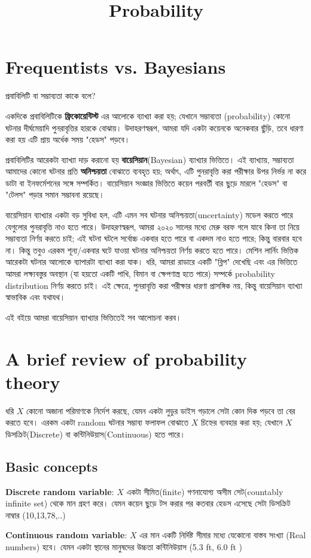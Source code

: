 \documentclass[graybox, envcountchap, twocolumn]{styles/svmult}
\begin{document}
\title{Probability}
{\bengalifont
\section{Frequentists vs. Bayesians}
প্রবাবিলিটি বা সম্ভাব্যতা কাকে বলে?

একদিকে প্রবাবিলিটিকে  \textbf{ফ্রিকোয়েন্টিস্ট} এর আলোকে ব্যাখ্যা করা হয়; যেখানে সম্ভাব্যতা (probability) কোনো ঘটনার দীর্ঘমেয়াদি পুনরাবৃত্তির হারকে বোঝায়। উদাহরণস্বরূপ, আমরা যদি একটা কয়েনকে অনেকবার ছুঁড়ি, তবে ধারণা করা হয় এটি প্রায় অর্ধেক সময় "হেডস" পড়বে।

প্রবাবিলিটির আরেকটা ব্যাখ্যা দাড় করানো হয় \textbf{বায়েসিয়ান}(Bayesian) ব্যাখ্যার ভিত্তিতে। এই ব্যাখ্যায়, সম্ভাব্যতা আমাদের কোনো ঘটনার প্রতি \textbf{অনিশ্চয়তা} বোঝাতে ব্যবহৃত হয়; অর্থাৎ, এটি পুনরাবৃত্তি করা পরীক্ষার উপর নির্ভর না করে ডাটা বা ইনফর্মেশনের সঙ্গে সম্পর্কিত। বায়েসিয়ান সংজ্ঞার ভিত্তিতে কয়েন পরবর্তী বার ছুড়ে মারলে "হেডস" বা "টেলস" পড়ার সমান সম্ভাবনা রয়েছে।    


বায়েসিয়ান ব্যাখ্যার একটা বড় সুবিধা হল, এটি এমন সব ঘটনার অনিশ্চয়তা(uncertainty) মডেল করতে পারে যেগুলোর পুনরাবৃত্তি নাও হতে পারে।  উদাহরণস্বরূপ, আমরা ২০২০ সালের মধ্যে মেরু বরফ গলে যাবে কিনা তা নিয়ে সম্ভাব্যতা নির্ণয় করতে চাই; এই ঘটনা ঘটলে সর্বোচ্চ একবার হতে পারে বা একদম নাও হতে পারে; কিন্তু বারবার হবে না। কিন্তু তবুও এরকম শূন্য/একবার ঘটে যাওয়া ঘটনার অনিশ্চয়তা নির্ণয় করতে হতে পারে। 
মেশিন লার্নিং ভিত্তিক আরেকটা ঘটনার আলোকে ব্যাপারটা ব্যাখ্যা করা যাক। ধরি,  আমরা রাডারে একটি "ব্লিপ" দেখেছি এবং এর ভিত্তিতে আমরা লক্ষ্যবস্তুর অবস্থান (যা হয়তো একটি পাখি, বিমান বা ক্ষেপণাস্ত্র হতে পারে) সম্পর্কে probability distribution নির্ণয় করতে চাই। এই ক্ষেত্রে, পুনরাবৃত্তি করা পরীক্ষার ধারণা প্রাসঙ্গিক নয়, কিন্তু বায়েসিয়ান ব্যাখ্যা স্বাভাবিক এবং যথাযথ।

এই বইয়ে আমরা বায়েসিয়ান ব্যাখ্যার ভিত্তিতেই সব আলোচনা করব। 




\section{A brief review of probability theory}
ধরি $𝑋$ কোনো অজানা পরিমাণকে নির্দেশ করছে, যেমন একটা লুডুর ডাইস গড়ালে সেটা কোন দিক পড়বে তা বের করতে হবে। এরকম একটা random ঘটনার সম্ভাব্য ফলাফল বোঝাতে $X$ চিহ্নের ব্যবহার করা হয়; যেখানে $X$ ডিসক্রিট(Discrete) বা কন্টিনিউয়াস(Continuous) হতে পারে।  

\subsection{Basic concepts}


\textbf{Discrete random variable}: $X$ একটা সীমিত(finite) গণনাযোগ্য অসীম সেট(countably infinite set) থেকে মান গ্রহণ করে। যেমন কয়েন ছুড়ে টস করার পর কতবার হেডস এসেছে সেটা ডিসক্রিট নাম্বার (10,13,78,..)

\textbf{Continuous random variable}:  $X$ এর মান একটি নির্দিষ্ট সীমার মধ্যে যেকোনো বাস্তব সংখ্যা (Real numbers) হবে। যেমন একটা স্থানের মানুষদের উচ্চতা কন্টিনিউয়াস (5.3 ft, 6.0 ft )}
\end{document}
